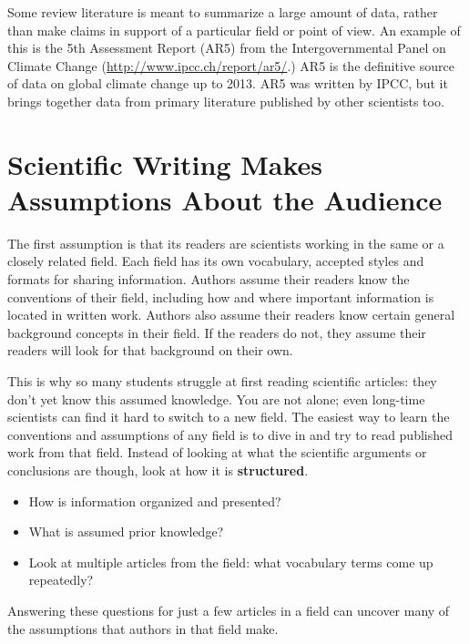 \documentclass[
]{book}
\providecommand{\tightlist}{%
  \setlength{\itemsep}{0pt}\setlength{\parskip}{0pt}}
\begin{document}
Some review literature is meant to summarize a large amount of data, rather than make claims in support of a particular field or point of view. An example of this is the 5th Assessment Report (AR5) from the Intergovernmental Panel on Climate Change (\url{http://www.ipcc.ch/report/ar5/}.) AR5 is the definitive source of data on global climate change up to 2013. AR5 was written by IPCC, but it brings together data from primary literature published by other scientists too.

\hypertarget{scientific-writing-makes-assumptions-about-the-audience}{%
\section{Scientific Writing Makes Assumptions About the Audience}\label{scientific-writing-makes-assumptions-about-the-audience}}

The first assumption is that its readers are scientists working in the same or a closely related field. Each field has its own vocabulary, accepted styles and formats for sharing information. Authors assume their readers know the conventions of their field, including how and where important information is located in written work. Authors also assume their readers know certain general background concepts in their field. If the readers do not, they assume their readers will look for that background on their own.

This is why so many students struggle at first reading scientific articles: they don't yet know this assumed knowledge. You are not alone; even long-time scientists can find it hard to switch to a new field. The easiest way to learn the conventions and assumptions of any field is to dive in and try to read published work from that field. Instead of looking at what the scientific arguments or conclusions are though, look at how it is \textbf{structured}.

\begin{itemize}
\tightlist
\item
  How is information organized and presented?
\item
  What is assumed prior knowledge?
\item
  Look at multiple articles from the field: what vocabulary terms come up repeatedly?
\end{itemize}

Answering these questions for just a few articles in a field can uncover many of the assumptions that authors in that field make.
\end{document}
